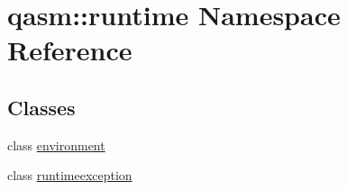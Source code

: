 \hypertarget{namespaceqasm_1_1runtime}{}\section{qasm\+:\+:runtime Namespace Reference}
\label{namespaceqasm_1_1runtime}
\subsection*{Classes}
\begin{DoxyCompactItemize}
\item 
class \hyperlink{classqasm_1_1runtime_1_1environment}{environment}
\item 
class \hyperlink{classqasm_1_1runtime_1_1runtimeexception}{runtimeexception}
\end{DoxyCompactItemize}
